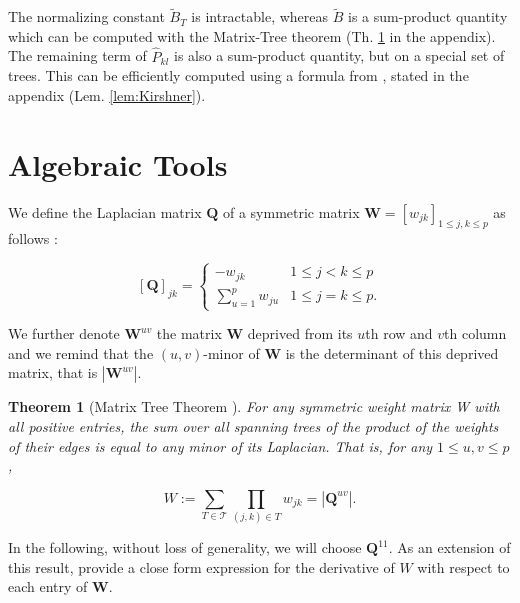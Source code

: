 \documentclass[11pt,a4paper]{article}
\newtheorem{theorem}{Theorem}
\newcommand{\Wbf}{\boldsymbol{W}}
\newcommand{\Qbf}{\boldsymbol{Q}}
\begin{document}
The normalizing constant $\widetilde{B}_T$ is intractable, whereas $\widetilde{B}$ is a sum-product quantity which can be computed with the Matrix-Tree theorem (Th. \ref{thm:MTT} in the appendix). The remaining term of $\hat{P}_{kl}$ is also a sum-product quantity, but on a special set of trees. This can be efficiently computed using a formula from \citet{kirshner}, stated in the appendix (Lem. \ref{lem:Kirshner}).
  

\newpage

 \appendix
 \section{Algebraic Tools}
 We define the Laplacian matrix $\Qbf$ of a symmetric matrix $\Wbf=[w_{jk} ]_{1\leq j,k\leq p}$ as follows :
 
\[
 [\Qbf]_{jk}  =\begin{cases}
    -w_{jk}  & 1\leq j<k \leq p\\
    \sum_{u=1}^p w_{ju} & 1\leq j=k \leq p.
    \end{cases}
\]
 
We further denote $\Wbf^{uv}$ the matrix $\Wbf$ deprived from its $u$th row and $v$th column and we remind that the $(u, v)$-minor of $\Wbf$ is the determinant of this deprived matrix, that is $|\Wbf^{uv}|$.

\begin{theorem}[Matrix Tree Theorem  \cite{matrixtree,Meila}] \label{thm:MTT}
    For any symmetric weight matrix W with all positive entries, the sum over all spanning trees of the product of the weights of their edges is equal to any minor of its Laplacian. That is, for any $1 \leq u, v \leq p$,
 
   \[
    W := \sum_{T\in\mathcal{T}} \prod_{(j, k)\in T} w_{jk} = |\Qbf^{uv}|.
    \]
   
\end{theorem}    

In the following, without loss of generality, we will choose $\Qbf^{11}$. As an extension of this result, \cite{Meila} provide a close form expression for the derivative of $W$ with respect to each entry of $\Wbf$. 
\end{document}
